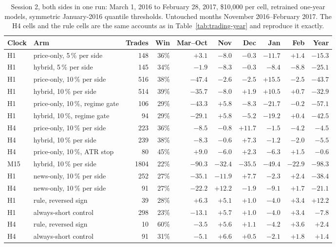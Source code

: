 \begin{table}[htbp]
\centering
\caption{Session 2, both sides in one run: March 1, 2016 to February 28, 2017, \$10,000 per cell, retrained one-year models, symmetric January-2016 quantile thresholds. Untouched months November 2016--February 2017. The H4 cells and the rule cells are the same accounts as in Table~\ref{tab:trading-year} and reproduce it exactly.}
\label{tab:session-2}
\scriptsize
\setlength{\tabcolsep}{3pt}
\begin{tabular}{llrrrrrrrr}
\toprule
\textbf{Clock} & \textbf{Arm} & \textbf{Trades} & \textbf{Win} & \textbf{Mar--Oct} & \textbf{Nov} & \textbf{Dec} & \textbf{Jan} & \textbf{Feb} & \textbf{Year} \\
\midrule
H1 & price-only, 5\,\% per side & 148 & 36\% & $+3.1$ & $-8.0$ & $-0.3$ & $-11.7$ & $+1.4$ & $-15.3$ \\
H1 & hybrid, 5\,\% per side & 145 & 34\% & $-1.9$ & $-8.3$ & $-0.3$ & $-8.4$ & $-8.8$ & $-25.1$ \\
H1 & price-only, 10\,\% per side & 516 & 38\% & $-47.4$ & $-2.6$ & $-2.5$ & $+15.5$ & $-2.5$ & $-43.7$ \\
H1 & hybrid, 10\,\% per side & 514 & 39\% & $-35.7$ & $-8.0$ & $+1.9$ & $+10.5$ & $+0.7$ & $-32.9$ \\
H1 & price-only, 10\,\%, regime gate & 106 & 29\% & $-43.3$ & $+5.8$ & $-8.3$ & $-21.7$ & $-0.2$ & $-57.1$ \\
H1 & hybrid, 10\,\%, regime gate & 94 & 29\% & $-29.1$ & $+5.8$ & $-5.2$ & $-19.2$ & $+0.4$ & $-42.5$ \\
H4 & price-only, 10\,\% per side & 223 & 36\% & $-8.5$ & $-0.8$ & $+11.7$ & $-1.5$ & $-4.2$ & $-4.5$ \\
H4 & hybrid, 10\,\% per side & 239 & 38\% & $-8.3$ & $-0.6$ & $+7.3$ & $-1.2$ & $-2.0$ & $-5.5$ \\
H4 & price-only, 10\,\%, ATR stop & 80 & 45\% & $+9.0$ & $-6.0$ & $+2.3$ & $-6.3$ & $+1.5$ & $-0.6$ \\
M15 & hybrid, 10\,\% per side & 1804 & 22\% & $-90.3$ & $-32.4$ & $-35.5$ & $-49.4$ & $-22.9$ & $-98.3$ \\
H1 & news-only, 10\,\% per side & 252 & 27\% & $-35.1$ & $-11.9$ & $+7.7$ & $-2.3$ & $+2.4$ & $-38.4$ \\
H4 & news-only, 10\,\% per side & 91 & 27\% & $-22.2$ & $+12.2$ & $-1.9$ & $-9.1$ & $+1.7$ & $-21.1$ \\
H1 & rule, reversed sign & 39 & 28\% & $+6.3$ & $+5.1$ & $+1.0$ & $-4.0$ & $+3.4$ & $+12.2$ \\
H1 & always-short control & 298 & 23\% & $-13.1$ & $+5.7$ & $+1.0$ & $-4.0$ & $+3.4$ & $-7.8$ \\
H4 & rule, reversed sign & 10 & 60\% & $-3.5$ & $+5.6$ & $+1.1$ & $-4.2$ & $+3.6$ & $+2.4$ \\
H4 & always-short control & 91 & 31\% & $-5.1$ & $+6.6$ & $+0.5$ & $-2.1$ & $+1.8$ & $+1.4$ \\
\bottomrule
\end{tabular}
\end{table}


